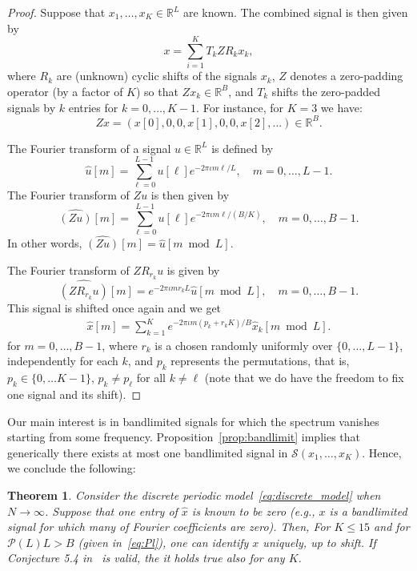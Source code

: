 \documentclass[english,12pt]{article}
\newcommand{\I}{\iota}
\newcommand{\R}{\mathbb{R}}
\newcommand{\hx}{\hat{x}}
\newtheorem{thm}{Theorem}
\numberwithin{equation}{section}
\numberwithin{thm}{section} %
\begin{document}
\begin{proof}
Suppose that $x_1,\ldots,x_K\in\R^L$ are known.
The combined signal is then given by 
\begin{equation}
x = \sum_{i=1}^K T_kZR_kx_k,
\end{equation}
where $R_k$ are (unknown) cyclic shifts of the signals $x_k$, $Z$ denotes a zero-padding operator (by a factor of $K$) so that $Zx_k\in\mathbb{R}^B$, and $T_k$ shifts the zero-padded signals by $k$ entries for $k=0,\ldots, K-1$. 
For instance, for $K=3$ we have: 
\begin{equation}
Zx = (x[0],0,0,x[1],0,0,x[2],...)\in\mathbb{R}^B.
\end{equation}

The Fourier transform of a signal $u\in\mathbb{R}^{L}$ is defined by 
\begin{equation}
\hat{u}[m]=\sum_{\ell=0}^{L-1}u[\ell]e^{-2\pi\I m\ell /L}, \quad m=0,\ldots,L-1. 
\end{equation}
The Fourier transform of $Zu$ is then given by 
\begin{equation}
\widehat{(Zu)}[m] = \sum_{\ell=0}^{L-1}u[\ell]e^{-2\pi\I m\ell /(B/K)}, \quad m=0,\ldots,B-1.
\end{equation}
In other words, $\widehat{(Zu)}[m] = \hat{u}[m\bmod L]$.

The Fourier transform of $ZR_{r_k}u$ is  given by 
\begin{equation}
\widehat{(ZR_{r_k}u)}[m] = e^{-2\pi\I m r_k L} \hat{u}[m\bmod L], \quad m=0,\ldots,B-1.
\end{equation}
This signal is shifted once again and we get
\begin{eqnarray} \label{eq:Fourier_structure}
\hat{x}[m] = \sum_{k=1}^K e^{-2\pi\I m( p_k+r_k K)/B} \hat{x}_k[m \bmod L]. 
\end{eqnarray}
for $m=0,\ldots,B-1$, 
where $r_k$ is a chosen randomly uniformly over $\{0,\ldots,L-1\}$, independently for each $k$, and $p_k$ represents the permutations, that is, $p_k\in\{0,\ldots K-1\}$, $p_k\neq p_\ell$ for all $k\neq \ell$ (note that we do have the freedom to fix one signal and its shift). 
\end{proof}
Our main interest is in bandlimited signals for which the spectrum vanishes starting from some frequency. Proposition~\ref{prop:bandlimit} implies that generically there exists at most one bandlimited signal in  $\mathcal{S}(x_1,\ldots,x_K)$.  
Hence, we conclude the following:
\begin{thm} \label{thm:discrete}
Consider the  discrete periodic model~\eqref{eq:discrete_model} when $N\to\infty$. Suppose that one entry of $\hx$ is known to be zero (e.g., $x$ is a bandlimited signal for which many of Fourier coefficients are zero). 
Then, For $K\leq 15$ and for $\mathcal{P}(L)L>B$ (given in~\eqref{eq:Pl}), one can identify $x$ uniquely, up to shift. 
If Conjecture 5.4 in~\cite{bandeira2017estimation} is valid, the it holds true also for any $K$.
\end{thm}
\end{document}
